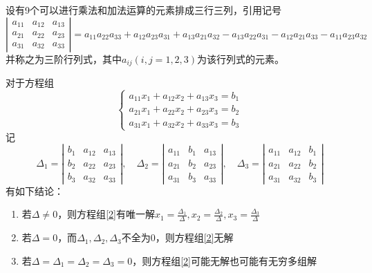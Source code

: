 \begin{definition}[三阶行列式]
  设有9个可以进行乘法和加法运算的元素排成三行三列，引用记号
  $$\left|\begin{array}{lll}
    a_{11} & a_{12} & a_{13} \\
    a_{21} & a_{22} & a_{23} \\
    a_{31} & a_{32} & a_{33}
    \end{array}\right|=a_{11} a_{22} a_{33}+a_{12} a_{23} a_{31}+a_{13} a_{21} a_{32}-a_{13} a_{22} a_{31}-a_{12} a_{21} a_{33}-a_{11} a_{23} a_{32}$$
    并称之为{\heiti 三阶行列式}，其中$a_{ij}(i,j=1,2,3)$为该行列式的元素。
\end{definition}

\begin{theorem}
  对于方程组
  \begin{equation}\label{2}
    \left\{\begin{array}{l}
      a_{11} x_{1}+a_{12} x_{2}+a_{13} x_{3}=b_{1} \\
      a_{21} x_{1}+a_{22} x_{2}+a_{23} x_{3}=b_{2} \\
      a_{31} x_{1}+a_{32} x_{2}+a_{33} x_{3}=b_{3}
      \end{array}\right.
  \end{equation}
  记$$\Delta_{1}=\left|\begin{array}{ccc}
    b_{1} & a_{12} & a_{13} \\
    b_{2} & a_{22} & a_{23} \\
    b_{3} & a_{32} & a_{33}
    \end{array}\right|, \quad \Delta_{2}=\left|\begin{array}{ccc}
    a_{11} & b_{1} & a_{13} \\
    a_{21} & b_{2} & a_{23} \\
    a_{31} & b_{3} & a_{33}
    \end{array}\right|, \quad \Delta_{3}=\left|\begin{array}{ccc}
    a_{11} & a_{12} & b_{1} \\
    a_{21} & a_{22} & b_{2} \\
    a_{31} & a_{32} & b_{3}
    \end{array}\right|$$
    有如下结论：
    \begin{enumerate}
      \item 若$\Delta\neq 0$，则方程组\eqref{2}有唯一解$\displaystyle{x_1=\frac{\Delta_1}{\Delta},x_2=\frac{\Delta_2}{\Delta},x_3=\frac{\Delta_3}{\Delta}}$
      \item 若$\Delta=0$，而$\Delta_1,\Delta_2,\Delta_3$不全为0，则方程组\eqref{2}无解
      \item 若$\Delta=\Delta_1=\Delta_2=\Delta_3=0$，则方程组\eqref{2}可能无解也可能有无穷多组解
    \end{enumerate}
\end{theorem}

